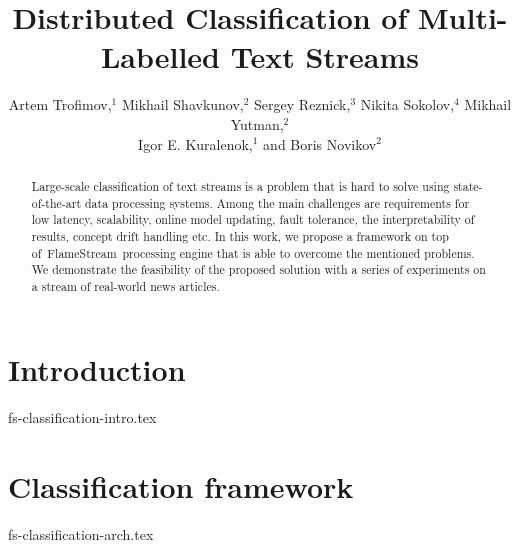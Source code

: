 \documentclass[sigconf]{acmart}
\theoremstyle{remark}
\newcommand {\FlameStream} {FlameStream}
\begin{document}

\title {Distributed Classification of Multi-Labelled Text Streams}

\author{Artem Trofimov,$^ {1}$    Mikhail Shavkunov,$^2$    Sergey Reznick,$^3$     Nikita Sokolov,$^{4}$   Mikhail Yutman,$^2$ \\   Igor E. Kuralenok,$^1$    and  Boris Novikov$^ {2}$ }

\begin{abstract}

Large-scale classification of text streams is a problem that is hard to solve using state-of-the-art data processing systems. Among the main challenges are requirements for low latency, scalability, online model updating, fault tolerance, the interpretability of results, concept drift handling etc. In this work, we propose a framework on top of~\FlameStream\ processing engine that is able to overcome the mentioned problems. We demonstrate the feasibility of the proposed solution with a series of experiments on a stream of real-world news articles.

\end{abstract}


\maketitle

\thispagestyle{empty}

\section {Introduction}
 {fs-classification-intro.tex}

\section {Classification framework}
 {fs-classification-arch.tex}
\end{document}
